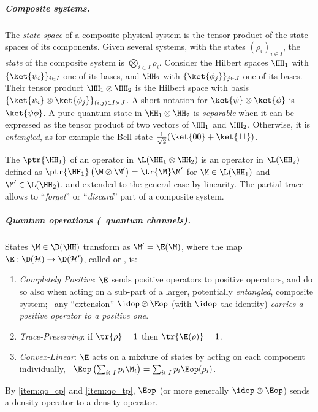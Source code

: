 \subparagraph{Composite systems.}

The \emph{state space} of a composite physical system is the tensor product of the state spaces of its components.
Given several systems, with the states $(\rho_i)_{i\in I}$, the \emph{state} of the composite system is $\bigotimes_{i\in I}\rho_i$.
Consider the Hilbert spaces $\HH_1$ with $\{\ket{\psi_i}\}_{i\in I}$ one of its bases, and $\HH_2$ with $\{\ket{\phi_j}\}_{j\in J}$ one of its bases.
Their tensor product $\HH_1 \otimes \HH_2$ is the Hilbert space with basis $\{\ket{\psi_i} \otimes \ket{\phi_j}\}_{(i,j)\in I\times J}$.
A short notation for $\ket{\psi}\otimes\ket{\phi}$ is $\ket{\psi\phi}$.
A pure quantum state in $\HH_1 \otimes \HH_2$ is \emph{separable} when it can be expressed as the tensor product of two vectors of $\HH_1$ and $\HH_2$.
Otherwise, it is \emph{entangled}, as for example the Bell state $\frac{1}{\sqrt{2}}(\ket{00} + \ket{11})$.

The  $\ptr{\HH_1}$ of an operator in $\L(\HH_1\otimes\HH_2)$ is an operator in $\L(\HH_2)$ defined as $\ptr{\HH_1}\left(\M\otimes\M'\right)=\tr{\M}\M'$ for $\M\in\L(\HH_1)$ and $\M'\in\L(\HH_2)$, and extended to the general case by linearity.
The partial trace allows to ``\emph{forget}'' or ``\emph{discard}'' part of a composite system.

\subparagraph{Quantum operations (\aka\ quantum channels).}

States $\M\in\D(\HH)$ transform as $\M' = \E(\M)$, where the map $\E: {\D}(\mathcal{H}) \to {\D}(\mathcal{H'})$, called  or , is:
\begin{enumerate}
\item\label{item:qo_cp}
\emph{Completely Positive}:
$\E$ sends positive operators to positive operators, and do so also when acting on a sub-part of a larger, potentially \emph{entangled}, composite system; \ie\ any ``extension'' $\idop\otimes \Eop$ (with $\idop$ the identity) \emph{carries a positive operator to a positive one}.
\item\label{item:qo_tp}
\emph{Trace-Preserving}:
if $\tr{\rho}=1$ then $\tr{\E(\rho)}=1$.
\item\label{item:qo_l}
\emph{Convex-Linear}:
$\E$ acts on a mixture of states by acting on each component individually, \ie\ $\Eop\left(\sum_{i\in I}p_{i}\M_{i}\right) = \sum_{i\in I}p_{i}\Eop(\rho_{i})$.
\end{enumerate}
By \ref{item:qo_cp} and \ref{item:qo_tp}, $\Eop$ (or more generally $\idop\otimes\Eop$) sends a density operator to a density operator.

